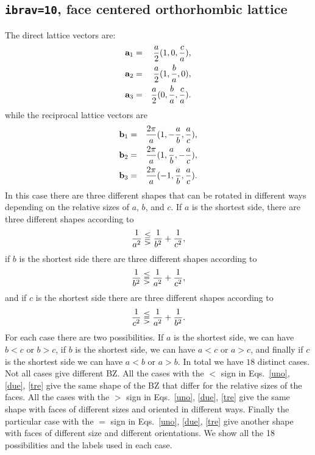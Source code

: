 \documentclass[12pt,a4paper]{article}
\begin{document}
\subsection{\texttt{ibrav=10}, face centered orthorhombic lattice}
The direct lattice vectors are:
\begin{eqnarray}
{\bf a}_1 &=& {a \over 2} (1, 0, {c \over a}), \nonumber \\
{\bf a}_2 &=& {a \over 2} (1, {b \over a}, 0), \nonumber \\
{\bf a}_3 &=& {a \over 2} (0, {b \over a}, {c \over a}). \nonumber
\nonumber
\end{eqnarray}
while the reciprocal lattice vectors are
\begin{eqnarray}
{\bf b}_1 &=& {2\pi \over a} (1, -{a \over b}, {a \over c}), \nonumber \\
{\bf b}_2 &=& {2\pi \over a} (1, {a \over b}, -{a \over c}), \nonumber \\
{\bf b}_3 &=& {2\pi \over a} (-1, {a \over b}, {a \over c}). \nonumber
\nonumber
\end{eqnarray}
In this case there are three different shapes 
that can be rotated in different ways depending on the relative
sizes of $a$, $b$, and $c$. 
If $a$ is the shortest side, there are three different shapes according
to 
\begin{equation}
{1\over a^2} \lesseqqgtr
{1\over b^2} + {1\over c^2},
\label{uno}
\end{equation}
if $b$ is the shortest side there are three different shapes according to 
\begin{equation}
{1\over b^2} \lesseqqgtr {1\over a^2} + {1\over c^2},
\label{due}
\end{equation}
and if $c$ is the shortest side there are
three different shapes according to 
\begin{equation}
{1\over c^2} \lesseqqgtr {1\over a^2} 
+ {1\over b^2}.
\label{tre}
\end{equation}
For each case there are two possibilities. If $a$
is the shortest side, we can have $b<c$ or $b>c$, if $b$ is
the shortest side, we can have $a<c$ or $a>c$, and finally
if $c$ is the shortest side we can have $a<b$ or $a>b$. In total we
have $18$ distinct cases. Not all cases give different BZ.
All the cases with the $<$ sign in Eqs.~\ref{uno}, \ref{due}, \ref{tre} give
the same shape of the BZ that differ for the relative sizes of the faces. 
All the cases with the $>$ sign in Eqs.~\ref{uno}, \ref{due}, \ref{tre} give 
the same shape with faces of different sizes and oriented in different ways. 
Finally the particular case with the $=$ sign in Eqs.~\ref{uno}, 
\ref{due}, \ref{tre} give another shape 
with faces of different size and different orientations. 
We show all the 18 possibilities and the labels used in each case.
\end{document}
